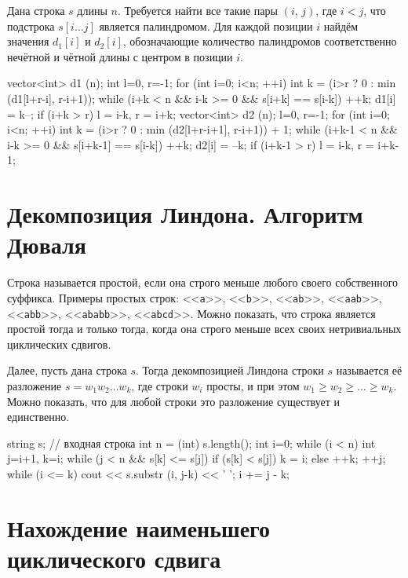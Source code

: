 \documentclass[12pt, titlepage]{article}
\renewcommand{\tt}[1]{\texttt{\small #1}}
\begin{document}
Дана строка $s$ длины $n$. Требуется найти все такие пары $(i,\,j)$, где $i<j$, что подстрока $s[i\ldots j]$ является палиндромом. Для каждой позиции $i$ найдём значения $d_1[i]$ и $d_2[i]$, обозначающие количество палиндромов соответственно нечётной и чётной длины с центром в позиции $i$.

\begin{cppcode}
vector<int> d1 (n);
int l=0, r=-1;
for (int i=0; i<n; ++i) {
    int k = (i>r ? 0 : min (d1[l+r-i], r-i+1));
    while (i+k < n && i-k >= 0 && s[i+k] == s[i-k])  ++k;
    d1[i] = k--;
    if (i+k > r)
        l = i-k,  r = i+k;
}
vector<int> d2 (n);
l=0, r=-1;
for (int i=0; i<n; ++i) {
    int k = (i>r ? 0 : min (d2[l+r-i+1], r-i+1)) + 1;
    while (i+k-1 < n && i-k >= 0 && s[i+k-1] == s[i-k])  ++k;
    d2[i] = --k;
    if (i+k-1 > r)
        l = i-k,  r = i+k-1;
}
\end{cppcode}

\section{Декомпозиция Линдона. Алгоритм Дюваля}

Строка называется простой, если она строго меньше любого своего собственного суффикса. Примеры простых строк: <<\tt{a}>>, <<\tt{b}>>, <<\tt{ab}>>, <<\tt{aab}>>, <<\tt{abb}>>, <<\tt{ababb}>>, <<\tt{abcd}>>. Можно показать, что строка является простой тогда и только тогда, когда она строго меньше всех своих нетривиальных циклических сдвигов.

Далее, пусть дана строка $s$. Тогда декомпозицией Линдона строки $s$ называется её разложение $s=w_1w_2\ldots w_k$, где строки $w_i$ просты, и при этом $w_1 \ge w_2 \ge \ldots \ge w_k$. Можно показать, что для любой строки  это разложение существует и единственно.

\begin{cppcode}
string s; // входная строка
int n = (int) s.length();
int i=0;
while (i < n) {
    int j=i+1, k=i;
    while (j < n && s[k] <= s[j]) {
        if (s[k] < s[j])
            k = i;
        else
            ++k;
        ++j;
    }
    while (i <= k) {
        cout << s.substr (i, j-k) << ' ';
        i += j - k;
    }
}
\end{cppcode}


\section{Нахождение наименьшего циклического сдвига}
\end{document}
